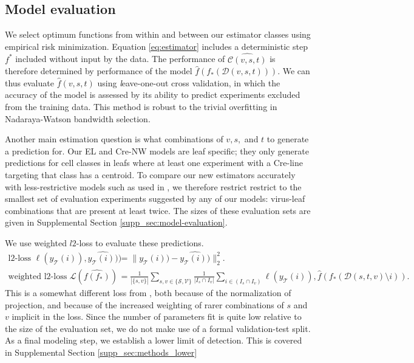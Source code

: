 \newpage

\subsection{Model evaluation}

We select optimum functions from within and between our estimator classes using empirical risk minimization. %
Equation \ref{eq:estimator} includes a deterministic step $f^*$ included without input by the data.
The performance of $\widehat {\mathcal C (v,s,t)}$ is therefore determined by performance of the model $\widehat f (f_*(\mathcal D(v,s,t)))$.
We can thus evaluate $\widehat f(v,s,t)$ using {\textit leave-one-out cross validation}, in which the accuracy of the model is assessed by its ability to predict experiments excluded from the training data.
This method is robust to the trivial overfitting in Nadaraya-Watson bandwidth selection.


Another main estimation question is what combinations of $v, s, $ and $t$ to generate a prediction for.
Our EL and Cre-NW models are leaf specific; they only generate predictions for cell classes in leafs where at least one experiment with a Cre-line targeting that class has a centroid.
To compare our new estimators accurately with less-restrictive models such as used in \citet{Knox2019-ot}, we therefore restrict restrict to the smallest set of evaluation experiments suggested by any of our models: virus-leaf combinations that are present at least twice. 
The sizes of these evaluation sets are given in Supplemental Section \ref{supp_sec:model-evaluation}.

We use weighted $l2$-loss to evaluate these predictions.
\begin{align*}
\text{l2-loss } \ell (y_{\mathcal T}(i)),\widehat {y_{\mathcal T}(i))}) &=   \| y_{\mathcal T} (i)) - \widehat {y_{\mathcal T}(i))} \|_2^2. \\
\text{weighted l2-loss } \mathcal L ( \widehat {f(f_*)}) &= \frac{1}{|\{s,v\}|} \sum_{s,v \in \{\mathcal S,\mathcal V\}} \frac{1}{ |I_{s} \cap I_v |} \sum_{i \in (I_{s} \cap I_v ) } \ell (y_{\mathcal T}(i)), \hat f(f_*(\mathcal D(s,t,v) \setminus i)) .
\end{align*}
This is a somewhat different loss from \citet{Knox2019-ot}, both because of the normalization of projection, and because of the increased weighting of rarer combinations of $s$ and $v$ implicit in the loss.
Since the number of parameters fit is quite low relative to the size of the evaluation set, we do not make use of a formal validation-test split.
As a final modeling step, we establish a lower limit of detection.
This is covered in Supplemental Section \ref{supp_sec:methods_lower}

